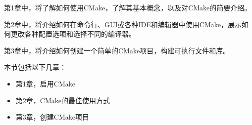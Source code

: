 
第1章中，将了解如何使用CMake，了解其基本概念，以及对CMake的简要介绍。

第2章中，将介绍如何在命令行、GUI或各种IDE和编辑器中使用CMake，展示如何更改各种配置选项和选择不同的编译器。

第3章中，将介绍如何创建一个简单的CMake项目，构建可执行文件和库。

本节包括以下几章：

\begin{itemize}
\item 第1章，启用CMake
\item 第2章，CMake的最佳使用方式
\item 第3章，创建CMake项目
\end{itemize}